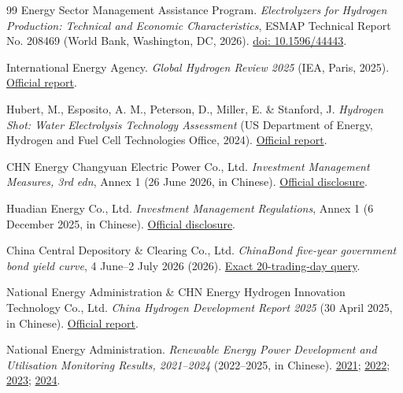 \documentclass[pdflatex,sn-nature]{sn-jnl}
\begin{document}
\begin{thebibliography}{99}
Energy Sector Management Assistance Program. \emph{Electrolyzers for Hydrogen Production: Technical and Economic Characteristics}, ESMAP Technical Report No. 208469 (World Bank, Washington, DC, 2026). \href{https://doi.org/10.1596/44443}{doi: 10.1596/44443}.

International Energy Agency. \emph{Global Hydrogen Review 2025} (IEA, Paris, 2025). \href{https://www.iea.org/reports/global-hydrogen-review-2025}{Official report}.

Hubert, M., Esposito, A. M., Peterson, D., Miller, E. \& Stanford, J. \emph{Hydrogen Shot: Water Electrolysis Technology Assessment} (US Department of Energy, Hydrogen and Fuel Cell Technologies Office, 2024). \href{https://www.energy.gov/sites/default/files/2024-12/hydrogen-shot-water-electrolysis-technology-assessment.pdf}{Official report}.

CHN Energy Changyuan Electric Power Co., Ltd. \emph{Investment Management Measures, 3rd edn}, Annex 1 (26 June 2026, in Chinese). \href{https://static.cninfo.com.cn/finalpage/2026-06-26/1225388602.PDF}{Official disclosure}.

Huadian Energy Co., Ltd. \emph{Investment Management Regulations}, Annex 1 (6 December 2025, in Chinese). \href{https://static.cninfo.com.cn/finalpage/2025-12-06/1224855581.PDF}{Official disclosure}.

China Central Depository \& Clearing Co., Ltd. \emph{ChinaBond five-year government bond yield curve}, 4 June--2 July 2026 (2026). \href{https://yield.chinabond.com.cn/cbweb-pbc-web/pbc/historyQuery?startDate=2026-06-04\&endDate=2026-07-02\&gjqx=0\&qxId=ycqx}{Exact 20-trading-day query}.

National Energy Administration \& CHN Energy Hydrogen Innovation Technology Co., Ltd. \emph{China Hydrogen Development Report 2025} (30 April 2025, in Chinese). \href{https://www.nea.gov.cn/20250430/96022785b3a747248288ad1c57d3a025/c.html}{Official report}.

National Energy Administration. \emph{Renewable Energy Power Development and Utilisation Monitoring Results, 2021--2024} (2022--2025, in Chinese). \href{https://www.nea.gov.cn/2022-09/16/c_1310663387.htm}{2021}; \href{https://zfxxgk.nea.gov.cn/2023-09/07/c_1310741874.htm}{2022}; \href{https://zfxxgk.nea.gov.cn/2024-10/10/c_1310787115.htm}{2023}; \href{https://www.nea.gov.cn/20251113/cc1fb0298a2944f8bd5441f67c9be9b3/c.html}{2024}.


\end{thebibliography}
\end{document}
